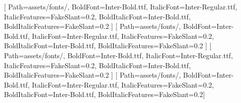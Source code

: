 \usepackage[letterpaper,left=0.75in,right=0.75in,top=1.42in,bottom=1.18in,headheight=18pt,headsep=16pt,footskip=0.57in]{geometry}
\usepackage{fontspec}
\setmainfont{Inter-Regular.ttf}[
  Path=assets/fonts/,
  BoldFont=Inter-Bold.ttf,
  ItalicFont=Inter-Regular.ttf,
  ItalicFeatures={FakeSlant=0.2},
  BoldItalicFont=Inter-Bold.ttf,
  BoldItalicFeatures={FakeSlant=0.2}
]
\setsansfont{Inter-Regular.ttf}[
  Path=assets/fonts/,
  BoldFont=Inter-Bold.ttf,
  ItalicFont=Inter-Regular.ttf,
  ItalicFeatures={FakeSlant=0.2},
  BoldItalicFont=Inter-Bold.ttf,
  BoldItalicFeatures={FakeSlant=0.2}
]
\newfontfamily{}[
  Path=assets/fonts/,
  BoldFont=Inter-Bold.ttf,
  ItalicFont=Inter-Regular.ttf,
  ItalicFeatures={FakeSlant=0.2},
  BoldItalicFont=Inter-Bold.ttf,
  BoldItalicFeatures={FakeSlant=0.2}
]
\newfontfamily{}[
  Path=assets/fonts/,
  BoldFont=Inter-Bold.ttf,
  ItalicFont=Inter-Regular.ttf,
  ItalicFeatures={FakeSlant=0.2},
  BoldItalicFont=Inter-Bold.ttf,
  BoldItalicFeatures={FakeSlant=0.2}]

